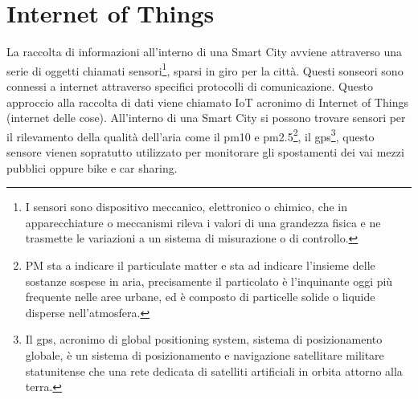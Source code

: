 \section{Internet of Things}
La raccolta di informazioni all'interno di una Smart City avviene attraverso una serie di oggetti chiamati sensori\footnote{I sensori sono dispositivo meccanico, elettronico o chimico, che in apparecchiature o meccanismi rileva i valori di una grandezza fisica e ne trasmette le variazioni a un sistema di misurazione o di controllo.}, sparsi in giro per la città. Questi sonseori sono connessi a internet attraverso specifici protocolli di comunicazione. Questo approccio alla raccolta di dati viene chiamato IoT acronimo di Internet of Things (internet delle cose).
All'interno di una Smart City si possono trovare sensori per il rilevamento della qualità dell'aria come il pm10 e pm2.5\footnote{PM sta a indicare il particulate matter e sta ad indicare l'insieme delle sostanze sospese in aria, precisamente il particolato è l'inquinante oggi più frequente nelle aree urbane, ed è composto di particelle solide o liquide disperse nell'atmosfera.}, il gps\footnote{Il gps, acronimo di global positioning system, sistema di posizionamento globale, è un sistema di posizionamento e navigazione satellitare militare statunitense che una rete dedicata di satelliti artificiali in orbita attorno alla terra.}, questo sensore vienen sopratutto utilizzato per monitorare gli spostamenti dei vai mezzi pubblici oppure bike e car sharing.
